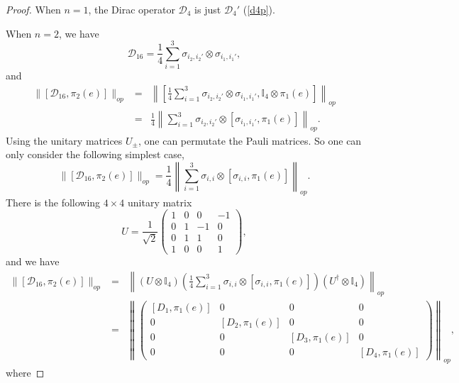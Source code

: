 \documentclass[10pt,a4paper]{amsart}
\begin{document}
\begin{proof}
	When $n = 1$, the Dirac operator $\mathcal{D}_{4}$ is just $\mathcal{D}_4'$ (\ref{d4p}).

When $n = 2$, we have
\begin{equation}
	\mathcal{D}_{16} = \frac{1}{4}  \sum_{i = 1}^3 \sigma_{i_2, i_2'} \otimes
	\sigma_{i_1, i_1'},
\end{equation}
and
\begin{eqnarray}
	\|[\mathcal{D}_{16}, \pi_2 (e)]\|_{op} & = & \left\| \left[ \frac{1}{4} 
	\sum_{i = 1}^3 \sigma_{i_2, i_2'} \otimes \sigma_{i_1, i_1'}, \mathbb{I}_4
	\otimes \pi_1 (e) \right] \right\|_{op} \nonumber\\
	& = & \frac{1}{4} \left\| \sum_{i = 1}^3 \sigma_{i_2, i_2'} \otimes
	[\sigma_{i_1, i_1'}, \pi_1 (e)] \right\|_{op} . 
\end{eqnarray}
Using the unitary matrices $U_{\pm}$, one can permutate the Pauli matrices. So
one can only consider the following simplest case,
\begin{equation}
	\|[\mathcal{D}_{16}, \pi_2 (e)]\|_{op} = \frac{1}{4} \left\| \sum_{i = 1}^3
	\sigma_{i, i} \otimes [\sigma_{i, i}, \pi_1 (e)] \right\|_{op} .
\end{equation}
There is the following $4 \times 4$ unitary matrix
\begin{equation}
	U = \frac{1}{\sqrt{2}} \left( \begin{array}{cccc}
		1 & 0 & 0 & - 1\\
		0 & 1 & - 1 & 0\\
		0 & 1 & 1 & 0\\
		1 & 0 & 0 & 1
	\end{array} \right),
\end{equation}
and we have
\begin{eqnarray}
	\|[\mathcal{D}_{16}, \pi_2 (e)]\|_{op} 
	& = & \left\| (U \otimes \mathbb{I}_4) \left( \frac{1}{4}  \sum_{i = 1}^3
	\sigma_{i, i} \otimes [\sigma_{i, i}, \pi_1 (e)] \right) (U^{\dag} \otimes
	\mathbb{I}_4) \right\|_{op} \\
	& = & \left\| \left( \begin{array}{cccc}
		{}[D_1, \pi_1 (e)] & 0 & 0 & 0\\
		0 & [D_2, \pi_1 (e)] & 0 & 0\\
		0 & 0 & [D_3, \pi_1 (e)] & 0\\
		0 & 0 & 0 & [D_4, \pi_1 (e)]
	\end{array} \right) \right\|_{op}, \nonumber
\end{eqnarray}
where

\end{proof}
\end{document}
